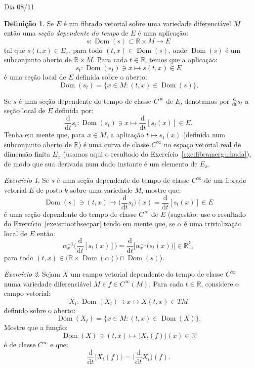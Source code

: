 \documentclass[oneside,11pt]{amsart}
\newcommand{\R}{\mathds R}
\newcommand{\dd}{\mathrm d}
\DeclareMathOperator{\Dom}{Dom}
\theoremstyle{remark}\newtheorem{exercise}{Exercício}[section]
\theoremstyle{plain}\newtheorem{teo}{Teorema}[section]
\theoremstyle{plain}\newtheorem{lem}[teo]{Lema}
\theoremstyle{plain}\newtheorem{prop}[teo]{Proposição}
\theoremstyle{definition}\newtheorem{defin}[teo]{Definição}
\theoremstyle{remark}\newtheorem{rem}[teo]{Observação}
\theoremstyle{definition}\newtheorem{example}[teo]{Exemplo}
\numberwithin{equation}{section}
\begin{document}
\begin{section}{Dia 08/11}
\begin{defin}
Se $E$ é um fibrado vetorial sobre uma variedade diferenciável $M$ então uma {\em seção dependente do tempo\/} de $E$ é uma aplicação:
\[s:\Dom(s)\subset\R\times M\longrightarrow E\]
tal que $s(t,x)\in E_x$, para todo $(t,x)\in\Dom(s)$, onde $\Dom(s)$ é um subconjunto aberto de $\R\times M$. Para cada $t\in\R$,
temos que a aplicação:
\[s_t:\Dom(s_t)\ni x\longmapsto s(t,x)\in E\]
é uma seção local de $E$ definida sobre o aberto:
\[\Dom(s_t)=\big\{x\in M:(t,x)\in\Dom(s)\big\}.\]
\end{defin}
Se $s$ é uma seção dependente do tempo de classe $C^\infty$ de $E$, denotamos por $\frac{\dd}{\dd t}s_t$ a seção local de $E$ definida por:
\[\frac{\dd}{\dd t}s_t:\Dom(s_t)\ni x\longmapsto\frac{\dd}{\dd t}[s_t(x)]\in E.\]
Tenha em mente que, para $x\in M$, a aplicação $t\mapsto s_t(x)$ (definida num subconjunto aberto de $\R$) é uma curva de classe $C^\infty$
no espaço vetorial real de dimensão finita $E_x$ (usamos aqui o resultado do Exercício~\ref{exe:fibramergulhada}),
de modo que sua derivada num dado instante é um elemento de $E_x$.

\begin{exercise}\label{exe:ddtst}
Se $s$ é uma seção dependente do tempo de classe $C^\infty$ de um fibrado vetorial $E$ de posto $k$ sobre uma variedade $M$, mostre que:
\[\Dom(s)\ni(t,x)\longmapsto\Big(\frac{\dd}{\dd t}s_t\Big)(x)=\frac{\dd}{\dd t}[s_t(x)]\in E\]
é uma seção dependente do tempo de classe $C^\infty$ de $E$ (sugestão: use o resultado do Exercício~\ref{exe:smoothsecpar} tendo em mente que,
se $\alpha$ é uma trivialização local de $E$ então:
\begin{equation}\label{eq:alphaddt}
\alpha_x^{-1}\Big(\frac{\dd}{\dd t}[s_t(x)]\Big)=\frac{\dd}{\dd t}\big[\alpha_x^{-1}\big(s_t(x)\big)\big]\in\R^k,
\end{equation}
para todo $(t,x)\in\big(\R\times\Dom(\alpha)\big)\cap\Dom(s)$).
\end{exercise}

\begin{exercise}\label{exe:ddtcomutXft}
Sejam $X$ um campo vetorial dependente do tempo de classe $C^\infty$
numa variedade diferenciável $M$ e $f\in C^\infty(M)$. Para cada $t\in\R$, considere o campo vetorial:
\[X_t:\Dom(X_t)\ni x\longmapsto X(t,x)\in TM\]
definido sobre o aberto:
\[\Dom(X_t)=\big\{x\in M:(t,x)\in\Dom(X)\big\}.\]
Mostre que a função:
\[\Dom(X)\ni(t,x)\longmapsto\big(X_t(f)\big)(x)\in\R\]
é de classe $C^\infty$ e que:
\[\frac{\dd}{\dd t}\big(X_t(f)\big)=\Big(\frac{\dd}{\dd t}X_t\Big)(f).\]
\end{exercise}


\end{section}
\end{document}
